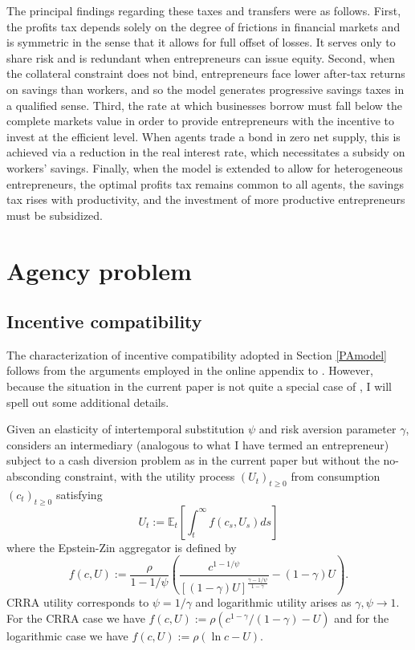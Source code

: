 \documentclass[11pt]{article}
\theoremstyle{plain}
\theoremstyle{definition} %
\begin{document}
The principal findings regarding these taxes and transfers were as follows. First, the profits tax depends solely on the degree of frictions in financial markets and is symmetric in the sense that it allows for full offset of losses. It serves only to share risk and is redundant when entrepreneurs can issue equity. Second, when the collateral constraint does not bind, entrepreneurs face lower after-tax returns on savings than workers, and so the model generates progressive savings taxes in a qualified sense. Third, the rate at which businesses borrow must fall below the complete markets value in order to provide entrepreneurs with the incentive to invest at the efficient level. When agents trade a bond in zero net supply, this is achieved via a reduction in the real interest rate, which necessitates a subsidy on workers' savings. Finally, when the model is extended to allow for heterogeneous entrepreneurs, the optimal profits tax remains common to all agents, the savings tax rises with productivity, and the investment of more productive entrepreneurs must be subsidized. 



\appendix
\small

\section{Agency problem}\label{agencyAPP}
\subsection{Incentive compatibility} \label{agency_IC}

The characterization of incentive compatibility adopted in Section \ref{PAmodel} follows from the arguments employed in the online appendix to \cite{di_tella_optimal_2019}. However, because the situation in the current paper is not quite a special case of \cite{di_tella_optimal_2019}, I will spell out some additional details.

Given an elasticity of intertemporal substitution $\psi$ and risk aversion parameter $\gamma$, \cite{di_tella_optimal_2019} considers an intermediary (analogous to what I have termed an entrepreneur) subject to a cash diversion problem as in the current paper but without the no-absconding constraint, with the utility process $(U_t)_{t\geq0}$ from consumption $(c_t)_{t\geq0}$ satisfying
\begin{equation}
U_t := \mathbb{E}_t{\left[ \int_t^{\infty} f(c_s, U_s) ds \right]}
\label{EZint}
\end{equation}
where the Epstein-Zin aggregator is defined by 
\begin{equation}
f(c, U) := \frac{\rho}{1-1/\psi} {\left(\frac{c^{1-1/\psi}}{[(1-\gamma)U]^{\frac{\gamma-1/\psi}{1-\gamma}}} - (1-\gamma) U \right)}.
\label{EZf}
\end{equation}
CRRA utility corresponds to $\psi = 1/\gamma$ and logarithmic utility arises as $\gamma, \psi \rightarrow 1$. For the CRRA case we have $f(c, U) := \rho{\left(c^{1-\gamma}/(1-\gamma) - U \right)}$ and for the logarithmic case we have $f(c, U) := \rho{\left(\ln c - U \right)}$. 
\end{document}
